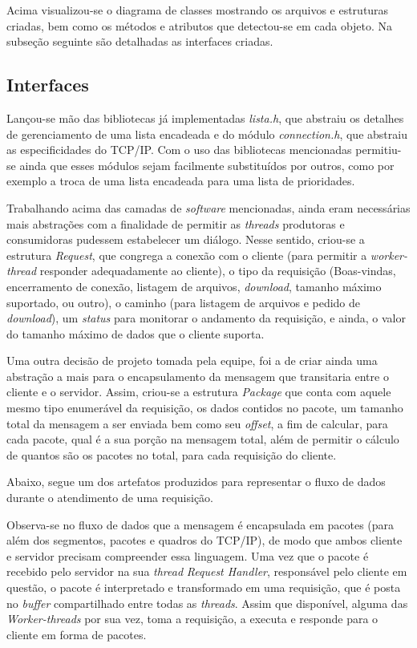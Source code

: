 \documentclass[12pt]{article}
\begin{document}
Acima visualizou-se o diagrama de classes mostrando os arquivos e estruturas criadas, bem como os métodos e atributos que detectou-se em cada objeto. Na subseção seguinte são detalhadas as interfaces criadas.

\subsection{Interfaces}

Lançou-se mão das bibliotecas já implementadas \emph{lista.h}, que abstraiu os detalhes de gerenciamento de uma lista encadeada e do módulo \emph{connection.h}, que abstraiu as especificidades do TCP/IP. Com o uso das bibliotecas mencionadas permitiu-se ainda que esses módulos sejam facilmente substituídos por outros, como por exemplo a troca de uma lista encadeada para uma lista de prioridades.

Trabalhando acima das camadas de \textit{software} mencionadas, ainda eram necessárias mais abstrações com a finalidade de permitir as \textit{threads} produtoras e consumidoras pudessem estabelecer um diálogo. Nesse sentido, criou-se a estrutura \textit{Request}, que congrega a conexão com o cliente (para permitir a \textit{worker-thread} responder adequadamente ao cliente), o tipo da requisição (Boas-vindas, encerramento de conexão, listagem de arquivos, \textit{download}, tamanho máximo suportado, ou outro), o caminho (para listagem de arquivos e pedido de \textit{download}), um \textit{status} para monitorar o andamento da requisição, e ainda, o valor do tamanho máximo de dados que o cliente suporta.

Uma outra decisão de projeto tomada pela equipe, foi a de criar ainda uma abstração a mais para o encapsulamento da mensagem que transitaria entre o cliente e o servidor. Assim, criou-se a estrutura \textit{Package} que conta com aquele mesmo tipo enumerável da requisição, os dados contidos no pacote, um tamanho total da mensagem a ser enviada bem como seu \textit{offset}, a fim de calcular, para cada pacote, qual é a sua porção na mensagem total, além de permitir o cálculo de quantos são os pacotes no total, para cada requisição do cliente.

Abaixo, segue um dos artefatos produzidos para representar o fluxo de dados durante o atendimento de uma requisição.

\newpage

Observa-se no fluxo de dados que a mensagem é encapsulada em pacotes (para além dos segmentos, pacotes e quadros do TCP/IP), de modo que ambos cliente e servidor precisam compreender essa linguagem. Uma vez que o pacote é recebido pelo servidor na sua \textit{thread} \textit{Request Handler}, responsável pelo cliente em questão, o pacote é interpretado e transformado em uma requisição, que é posta no \textit{buffer} compartilhado entre todas as \textit{threads}. Assim que disponível, alguma das \textit{Worker-threads} por sua vez, toma a requisição, a executa e responde para o cliente em forma de pacotes.
\end{document}
